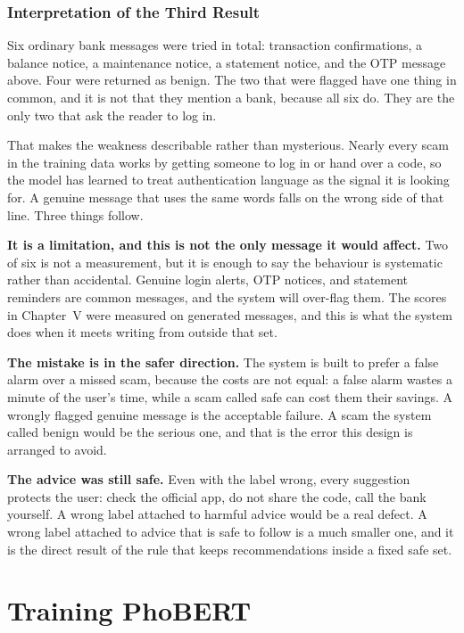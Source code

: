 \subsubsection*{Interpretation of the Third Result}

Six ordinary bank messages were tried in total: transaction confirmations, a
balance notice, a maintenance notice, a statement notice, and the OTP message
above. Four were returned as benign. The two that were flagged have one thing in
common, and it is not that they mention a bank, because all six do. They are the
only two that ask the reader to log in.

That makes the weakness describable rather than mysterious. Nearly every scam in
the training data works by getting someone to log in or hand over a code, so the
model has learned to treat authentication language as the signal it is looking
for. A genuine message that uses the same words falls on the wrong side of that
line. Three things follow.

\textbf{It is a limitation, and this is not the only message it would affect.}
Two of six is not a measurement, but it is enough to say the behaviour is
systematic rather than accidental. Genuine login alerts, OTP notices, and
statement reminders are common messages, and the system will over-flag them. The
scores in Chapter~V were measured on generated messages, and this is what the
system does when it meets writing from outside that set.

\textbf{The mistake is in the safer direction.} The system is built to prefer a
false alarm over a missed scam, because the costs are not equal: a false alarm
wastes a minute of the user's time, while a scam called safe can cost them their
savings. A wrongly flagged genuine message is the acceptable failure. A scam the
system called benign would be the serious one, and that is the error this design
is arranged to avoid.

\textbf{The advice was still safe.} Even with the label wrong, every suggestion
protects the user: check the official app, do not share the code, call the bank
yourself. A wrong label attached to harmful advice would be a real defect. A
wrong label attached to advice that is safe to follow is a much smaller one, and
it is the direct result of the rule that keeps recommendations inside a fixed
safe set.

\section{Training PhoBERT}

